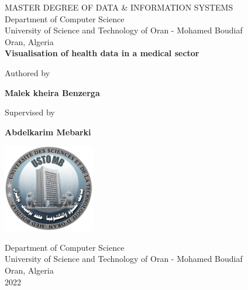 \begin{titlepage}
    \begin{center}
        MASTER DEGREE OF DATA \& INFORMATION SYSTEMS
        \vspace*{1cm}
        \\Department of Computer Science\\
        University of Science and Technology of Oran - Mohamed Boudiaf\\
        Oran, Algeria\\
 
        {\large
        \textbf{Visualisation of health data in a medical sector}}
 
        \vspace{1cm}
         Authored by
             
        \vspace{0.5cm}
 
        \textbf{Malek kheira Benzerga}


        \vspace{0.5cm}
         Supervised by
             
        \vspace{0.5cm}
 
        \textbf{Abdelkarim Mebarki}
 
        \vfill
             
        
        \vspace{0.8cm}
      
        \includegraphics[width=0.3\textwidth]{images/others/usto.jpg}
             
        \vspace{0.5cm}
        Department of Computer Science\\
        University of Science and Technology of Oran - Mohamed Boudiaf\\
        Oran, Algeria\\
        2022
             
    \end{center}
 \end{titlepage}